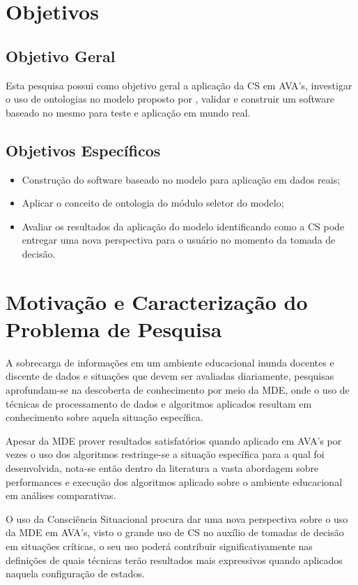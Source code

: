 \documentclass[
	oneside,
	12pt,				%
	a4paper,			%
	english,			%
	brazil,				%
	article
	]{abntex2}
\begin{document}
\section{Objetivos}

\subsection{Objetivo Geral}

Esta pesquisa possui como objetivo geral a aplicação da CS em AVA's, investigar o uso de ontologias no modelo proposto por , validar e construir um software baseado no mesmo para teste e aplicação em mundo real.

\subsection{Objetivos Específicos}

\begin{itemize}
	\item Construção do software baseado no modelo para aplicação em dados reais;
	\item Aplicar o conceito de ontologia do módulo seletor do modelo;
	\item Avaliar os resultados da aplicação do modelo identificando como a CS pode entregar uma nova perspectiva para o usuário no momento da tomada de decisão.  
\end{itemize}

\section{Motivação e Caracterização do Problema de Pesquisa}

A sobrecarga de informações em um ambiente educacional inunda docentes e discente de dados e situações que devem ser avaliadas diariamente, pesquisas aprofundam-se na descoberta de conhecimento por meio da MDE, onde o uso de técnicas de processamento de dados e algoritmos aplicados resultam em conhecimento sobre aquela situação específica.

Apesar da MDE prover resultados satisfatórios quando aplicado em AVA's por vezes o uso dos algoritmos restringe-se a situação específica para a qual foi desenvolvida, nota-se então dentro da literatura a vasta abordagem sobre performances e execução dos algoritmos aplicado sobre o ambiente educacional em análises comparativas. 

O uso da Consciência Situacional procura dar uma nova perspectiva sobre o uso da MDE em AVA's, visto o grande uso de CS no auxílio de tomadas de decisão em situações críticas, o seu uso poderá contribuir significativamente nas definições de quais técnicas terão resultados mais expressivos quando aplicados naquela configuração de estados.
\end{document}
